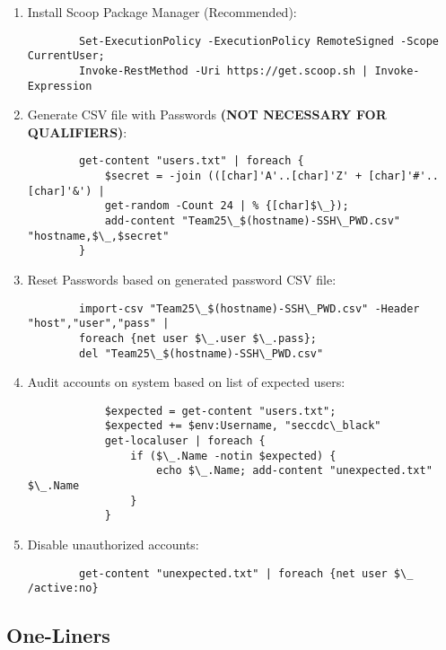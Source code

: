\documentclass[12pt,letterpaper]{article}
\def\bf#1{\textbf{#1}}
\begin{document}
\begin{enumerate}
	\item Install Scoop Package Manager (Recommended): \\
		{ \color{iris} \begin{verbatim}
		Set-ExecutionPolicy -ExecutionPolicy RemoteSigned -Scope CurrentUser;
		Invoke-RestMethod -Uri https://get.scoop.sh | Invoke-Expression
		\end{verbatim} }
	\item Generate CSV file with Passwords \bf{(NOT NECESSARY FOR QUALIFIERS)}:
		{ \color{iris} \begin{verbatim}
		get-content "users.txt" | foreach {
			$secret = -join (([char]'A'..[char]'Z' + [char]'#'..[char]'&') |
			get-random -Count 24 | % {[char]$\_});
			add-content "Team25\_$(hostname)-SSH\_PWD.csv" "hostname,$\_,$secret"
		}
		\end{verbatim} }
	\item Reset Passwords based on generated password CSV file:
		{ \color{iris} \begin{verbatim}
		import-csv "Team25\_$(hostname)-SSH\_PWD.csv" -Header "host","user","pass" |
		foreach {net user $\_.user $\_.pass};
		del "Team25\_$(hostname)-SSH\_PWD.csv"
		\end{verbatim} }
	\item Audit accounts on system based on list of expected users:
		{ \color{iris} \begin{verbatim}
			$expected = get-content "users.txt";
			$expected += $env:Username, "seccdc\_black"
			get-localuser | foreach {
				if ($\_.Name -notin $expected) {
					echo $\_.Name; add-content "unexpected.txt" $\_.Name
				}
			}
		\end{verbatim} }
	\item Disable unauthorized accounts:
		{ \color{iris} \begin{verbatim}
		get-content "unexpected.txt" | foreach {net user $\_ /active:no}
		\end{verbatim} }
\end{enumerate}

\pagebreak

\subsection{One-Liners}
\label{subsec:woliner}
\end{document}
